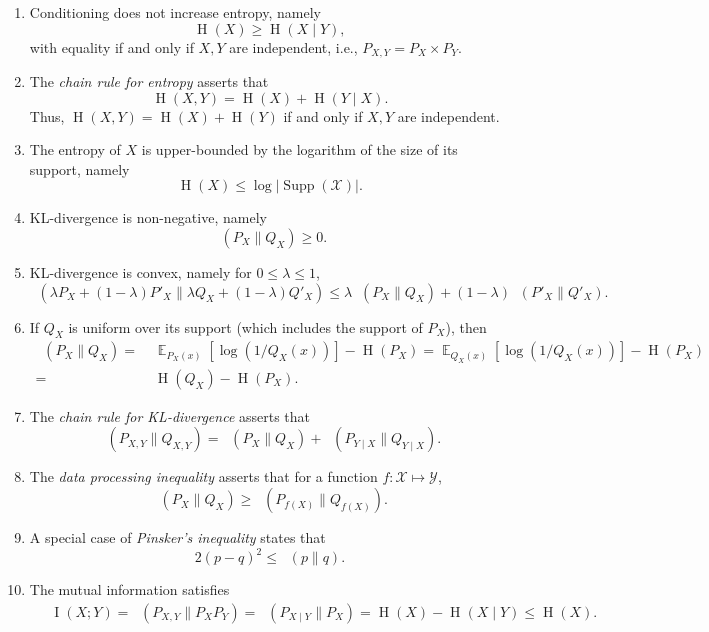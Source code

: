 \documentclass[11pt]{article}
\DeclareMathOperator*{\E}{\mathbb{E}}
\DeclareMathOperator{\HH}{H}
\DeclareMathOperator{\I}{I}
\DeclareMathOperator{\KL}{D_{\text{KL}}}
\DeclareMathOperator{\Supp}{\text{Supp}}
\begin{document}
\begin{enumerate}[label=(\arabic*), ref=\text{Property (}\arabic*\text{)}]
  \item \label{prope:conditioned entropy} Conditioning does not increase entropy, namely
$$\HH(X) \geq \HH(X \mid Y ),$$
   with equality if and only if $X,Y$ are independent, i.e., $P_{X,Y} = P_X \times P_Y$.
  \item \label{prope:chain rule entropy} The \emph{chain rule for entropy} asserts that $$\HH(X,Y) = \HH(X) + \HH(Y \mid X).$$
Thus, $\HH(X,Y) = \HH(X) + \HH(Y)$ if and only if $X,Y$ are independent.
  \item \label{prope:entropy bound} The entropy of $X$ is upper-bounded by the logarithm of the size of its support, namely
  $$\HH(X) \leq \log|\Supp(\mathcal{X})|.$$
  \item \label{prope:kl nonnegative} KL-divergence is non-negative, namely $$\KL(P_{X} \| Q_{X}) \geq 0.$$
  \item \label{prope:kl convex} KL-divergence is convex, namely for $0 \leq \lambda \le 1$,
  $$\KL( \lambda P_X + (1 - \lambda) P'_X \| \lambda Q_X + (1 - \lambda)Q'_X ) \leq
  \lambda \KL( P_X \| Q_X ) + (1 - \lambda) \KL( P'_X \| Q'_X ).$$
  \item \label{prope:kl and entropy} If $Q_X$ is uniform  over its support (which includes the support of $P_X$), then
    \begin{align*}
    \KL( P_X \| Q_X ) = &\; \E_{P_X(x)}[\log(1/ Q_X(x))] - \HH(P_X) = \E_{Q_X(x)}[\log(1/ Q_X(x))] - \HH(P_X) \\
    = &\; 
    \HH(Q_X) - \HH(P_X).
    \end{align*}
  \item \label{prope:chain rule kl} The \emph{chain rule for KL-divergence} asserts that
  $$\KL( P_{X,Y} \| Q_{X,Y}) =  \KL( P_X \| Q_X ) + \KL( P_{Y \mid X} \| Q_{Y \mid X} ) .$$
  \item \label{prope:data processing}
  The \emph{data processing inequality} asserts that for a function $f: \mathcal{X} \mapsto \mathcal{Y}$,
  $$\KL( P_X \| Q_X) \geq \KL( P_{f(X)} \| Q_{f(X)} ).$$
\item \label{prope:pinsker}
A special case of \emph{Pinsker's inequality} states that
  $$2 (p - q)^2 \leq \KL(p \| q ).$$
  \item \label{prope:information bound} The mutual information satisfies
  \begin{align*}
  &\; \I(X ; Y) = \KL(P_{X,Y} \| P_X P_Y) = 
  \KL(P_{X \mid Y} \| P_X) = \HH(X) - \HH(X \mid Y) \leq 
  \HH(X).
  \end{align*}
\end{enumerate}
\end{document}
